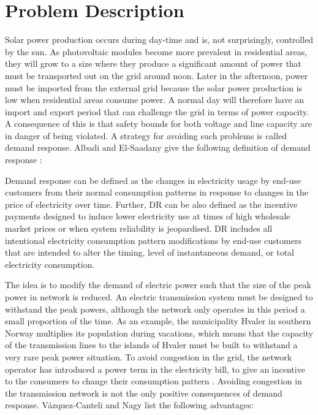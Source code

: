 \documentclass[class=book, crop=false, 11pt]{standalone}
\begin{document}
\chapter{Problem Description}\label{chap:problem_description}
Solar power production occurs during day-time and is, not surprisingly, controlled by the sun. As photovoltaic modules become more prevalent in residential areas, they will grow to a size where they produce a significant amount of power that must be transported out on the grid around noon. Later in the afternoon, power must be imported from the external grid because the solar power production is low when residential areas consume power. A normal day will therefore have an import and export period that can challenge the grid in terms of power capacity. A consequence of this is that safety bounds for both voltage and line capacity are in danger of being violated. A strategy for avoiding such problems is called demand response. Albadi and El-Saadany give the following definition of demand response \cite{demand_response_definition}:

\begin{displayquote}
Demand response can be defined as the changes in electricity usage by end-use customers from their normal consumption patterns in response to changes in the price of electricity over time. Further, DR can be also defined as the incentive payments designed to induce lower electricity use at times of high wholesale market prices or when system reliability is jeopardised. DR includes all intentional electricity consumption pattern modifications by end-use customers that are intended to alter the timing, level of
instantaneous demand, or total electricity consumption.
\end{displayquote}

The idea is to modify the demand of electric power such that the size of the peak power in network is reduced. An electric transmission system must be designed to withstand the peak powers, although the network only operates in this period a small proportion of the time. As an example, the municipality Hvaler in southern Norway multiplies its population during vacations, which means that the capacity of the transmission lines to the islands of Hvaler must be built to withstand a very rare peak power situation. To avoid congestion in the grid, the network operator has introduced a power term in the electricity bill, to give an incentive to the consumers to change their consumption pattern \cite{hvaler}. Avoiding congestion in the transmission network is not the only positive consequences of demand response. Vázquez-Canteli and Nagy list the following advantages\cite{vazquez2019reinforcement}:
\end{document}
